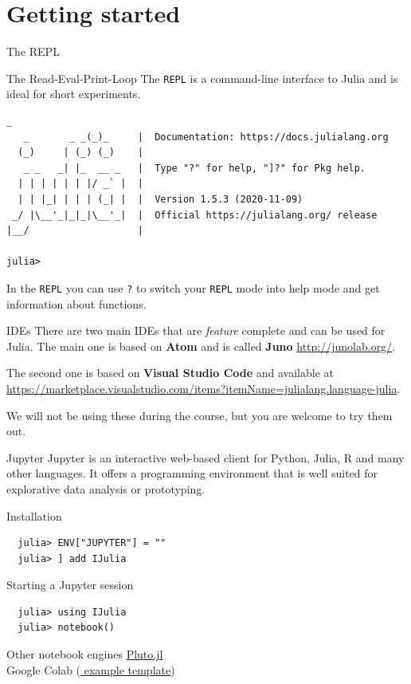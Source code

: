 \documentclass{beamer}
\begin{document}
\section{Getting started}
\begin{frame}[fragile]{The REPL}
  \begin{block}{The Read-Eval-Print-Loop}
    The \verb|REPL| is a command-line interface to Julia and is ideal for short experiments.
    \begin{Verbatim}[fontsize=\footnotesize]
               _
   _       _ _(_)_     |  Documentation: https://docs.julialang.org
  (_)     | (_) (_)    |
   _ _   _| |_  __ _   |  Type "?" for help, "]?" for Pkg help.
  | | | | | | |/ _` |  |
  | | |_| | | | (_| |  |  Version 1.5.3 (2020-11-09)
 _/ |\__'_|_|_|\__'_|  |  Official https://julialang.org/ release
|__/                   |

julia> 
\end{Verbatim}

In the \verb|REPL| you can use \verb|?| to switch your \verb|REPL| mode into help mode and get information about functions.
  \end{block}
\end{frame}
\begin{frame}{IDEs}
  There are two main IDEs that are \emph{feature} complete and can be used for Julia. The main one is based on \textbf{Atom} and is called \textbf{Juno} \url{http://junolab.org/}.

\vspace{0.5cm}
  The second one is based on \textbf{Visual Studio Code }and available at \url{https://marketplace.visualstudio.com/items?itemName=julialang.language-julia}.

\vspace{0.5cm}
  We will not be using these during the course, but you are welcome to try them out.
\end{frame}
\begin{frame}[fragile]{Jupyter}
  Jupyter is an interactive web-based client for Python, Julia, R and many other languages.
  It offers a programming environment that is well suited for explorative data analysis or prototyping.
  \begin{block}{Installation}
  \begin{Verbatim}
  julia> ENV["JUPYTER"] = ""
  julia> ] add IJulia
    \end{Verbatim}
  \end{block}
  \begin{block}{Starting a Jupyter session}
    \begin{Verbatim}
  julia> using IJulia
  julia> notebook()
    \end{Verbatim}
  \end{block}
  \begin{block}{Other notebook engines}
    \href{https://github.com/fonsp/Pluto.jl}{\color{blue} Pluto.jl}\\
    Google Colab (\href{https://colab.research.google.com/github/ageron/julia_notebooks/blob/master/Julia_Colab_Notebook_Template.ipynb}{\color{blue} example template})
  \end{block}
\end{frame}
\end{document}
